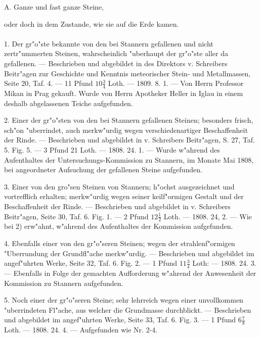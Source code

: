 \documentclass[a4paper, 11pt, oneside, polutonikogreek, german]{article}
\begin{document}
\setlength{\leftskip}{0pt}
\setlength{\parindent}{20pt}

\begin{center}
A. Ganze und fast ganze Steine,
\end{center}
oder doch in dem Zustande, wie sie auf die Erde kamen.
\paragraph{}
1. Der gr"o"ste bekannte von den bei Stannern gefallenen und nicht zertr"ummerten Steinen, wahrscheinlich "uberhaupt der gr"o"ste aller da gefallenen. --- Beschrieben und abgebildet in des Direktors v. Schreibers Beitr"agen zur Geschichte und Kenntnis meteorischer Stein- und Metallmassen, Seite 20, Taf. 4. --- 11 Pfund $10\frac{3}{4}$ Loth. --- 1809. 8. 1. --- Von Herrn Professor Mikan in Prag gekauft. Wurde von Herrn Apotheker Heller in Iglau in einem deshalb abgelassenen Teiche aufgefunden.

2. Einer der gr"o"sten von den bei Stannern gefallenen Steinen; besonders frisch, sch"on "uberrindet, auch merkw"urdig wegen verschiedenartiger Beschaffenheit der Rinde. --- Beschrieben und abgebildet in v. Schreibers Beitr"agen, S. 27, Taf. 5. Fig. 5. --- 3 Pfund 21 Loth. --- 1808. 24. 1. --- Wurde w"ahrend des Aufenthaltes der Untersuchungs-Kommission zu Stannern, im Monate Mai 1808, bei angeordneter Aufsuchung der gefallenen Steine aufgefunden.

3. Einer von den gro"sen Steinen von Stannern; h"ochst ausgezeichnet und vortrefflich erhalten; merkw"urdig wegen seiner keilf"ormigen Gestalt und der Beschaffenheit der Rinde. --- Beschrieben und abgebildet in v. Schreibers Beitr"agen, Seite 30, Taf. 6. Fig. 1. --- 2 Pfund $12\frac{1}{2}$ Loth. --- 1808. 24, 2. --- Wie bei 2) erw"ahnt, w"ahrend des Aufenthaltes der Kommission aufgefunden.

4. Ebenfalls einer von den gr"o"seren Steinen; wegen der strahlenf"ormigen "Uberrundung der Grundfl"ache merkw"urdig. --- Beschrieben und abgebildet im angef"uhrten Werke, Seite 32, Taf. 6. Fig. 2. --- 1 Pfund $11\frac{3}{4}$ Loth: --- 1808. 24. 3. --- Ebenfalls in Folge der gemachten Aufforderung w"ahrend der Anwesenheit der Kommission zu Stannern aufgefunden.

5. Noch einer der gr"o"seren Steine; sehr lehrreich wegen einer unvollkommen "uberrindeten Fl"ache, aus welcher die Grundmasse durchblickt. --- Beschrieben und abgebildet im angef"uhrten Werke, Seite 33, Taf. 6. Fig. 3. --- 1 Pfund $6\frac{7}{8}$ Loth. --- 1808. 24. 4. --- Aufgefunden wie Nr. 2-4.
\end{document}
